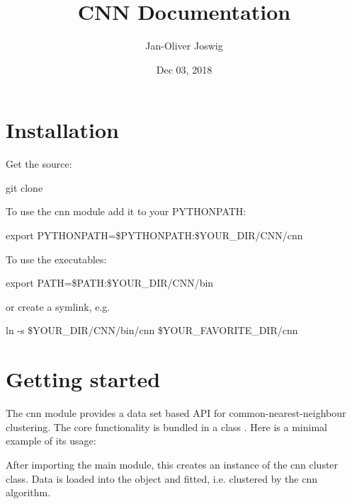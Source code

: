 \documentclass[letterpaper,10pt,english]{sphinxmanual}
\title{CNN Documentation}
\date{Dec 03, 2018}
\author{Jan-Oliver Joswig}
\begin{document}
\maketitle
\sphinxtableofcontents
{}\label{\detokenize{index::doc}}



\chapter{Installation}
\label{\detokenize{installation:installation}}\label{\detokenize{installation::doc}}
Get the source:

git clone 

To use the cnn module add it to your PYTHONPATH:

export PYTHONPATH=\$PYTHONPATH:\$YOUR\_DIR/CNN/cnn

To use the executables:

export PATH=\$PATH:\$YOUR\_DIR/CNN/bin

or create a symlink, e.g.

ln -s \$YOUR\_DIR/CNN/bin/cnn \$YOUR\_FAVORITE\_DIR/cnn


\chapter{Getting started}
\label{\detokenize{gettingstarted:getting-started}}\label{\detokenize{gettingstarted::doc}}
The cnn module provides a data set based API for
common-nearest-neighbour clustering. The core functionality is bundled
in a class . Here is a minimal example of its usage:

%
\begin{sphinxVerbatim}[commandchars=\\\{\}]
 
  
\end{sphinxVerbatim}

After importing the main module, this creates an instance of the cnn
cluster class. Data is loaded into the object and fitted, i.e.
clustered by the cnn algorithm.
\end{document}
